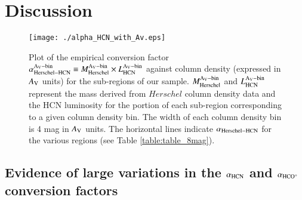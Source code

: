 \documentclass{aa}
\begin{document}
{\section{Discussion}


\begin{figure*}
\begin{center}
\texttt{[image: ./alpha\_HCN\_with\_Av.eps]}
\caption{Plot of the empirical conversion factor {$\alpha_{\rm Herschel-HCN}^{\rm A_V-bin} \equiv M_{\rm Herschel}^{\rm A_V-bin} \times L_{\rm HCN}^{\rm A_V-bin}$ 
against column density (expressed in $A_{\rm V}$ units) for the sub-regions of our sample. 
$M_{\rm Herschel}^{\rm A_V-bin}$ and $L_{\rm HCN}^{\rm A_V-bin}$ represent the mass derived from $Herschel$ column density data 
and the HCN luminosity for the portion of each sub-region corresponding to a given column density  bin. 
The width of each column density bin is 4 mag in $A_{\rm V}$ units. 
The horizontal lines indicate $\alpha_{\rm Herschel-HCN}$ for the various regions (see Table \ref{table:table_8mag}).}
}
\label{fig_alpha-Av}
\end{center}
\end{figure*}




\subsection{Evidence of large variations in the $\alpha_{\rm HCN}$ and $\alpha_{\rm HCO^+}$ conversion factors} \label{alpha_HCN}

}
\end{document}
